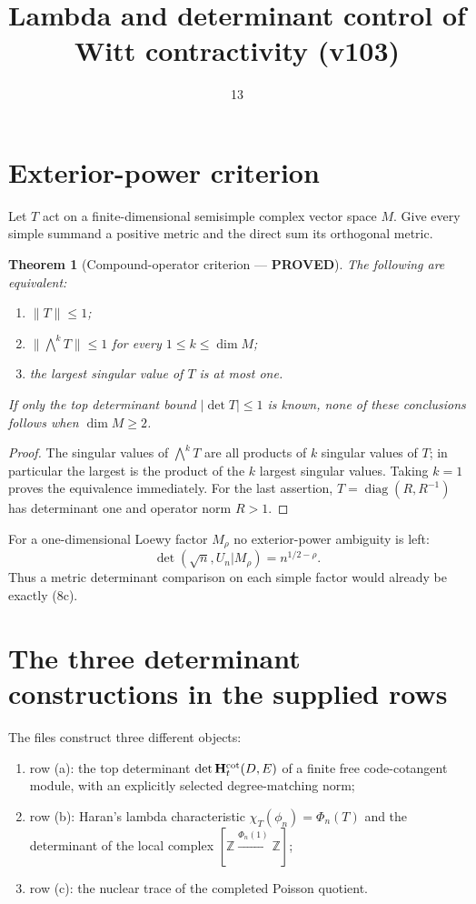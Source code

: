 \documentclass[11pt]{article}
\title{Lambda and determinant control of Witt contractivity (v103)}
\date{13}
\newcommand{\PROVED}{\textcolor{green!40!black}{\textbf{PROVED}}}
\newtheorem{theorem}{Theorem}
\begin{document}
\maketitle

\section{Exterior-power criterion}

Let $T$ act on a finite-dimensional semisimple complex vector space $M$.
Give every simple summand a positive metric and the direct sum its
orthogonal metric.

\begin{theorem}[Compound-operator criterion --- \PROVED]
The following are equivalent:
\begin{enumerate}
\item $\|T\|\le1$;
\item $\|\bigwedge^kT\|\le1$ for every $1\le k\le\dim M$;
\item the largest singular value of $T$ is at most one.
\end{enumerate}
If only the top determinant bound
$|\det T|\le1$ is known, none of these conclusions follows when
$\dim M\ge2$.
\end{theorem}

\begin{proof}
The singular values of $\bigwedge^kT$ are all products of $k$ singular
values of $T$; in particular the largest is the product of the $k$ largest
singular values.  Taking $k=1$ proves the equivalence immediately.  For the
last assertion, $T=\operatorname{diag}(R,R^{-1})$ has determinant one and
operator norm $R>1$.
\end{proof}

For a one-dimensional Loewy factor $M_\rho$ no exterior-power ambiguity is
left:
\begin{equation}
 \det(\sqrt n,U_n|M_\rho)=n^{1/2-\rho}.             \tag{1}
\end{equation}
Thus a metric determinant comparison on each simple factor would already
be exactly (8c).

\section{The three determinant constructions in the supplied rows}

The files construct three different objects:
\begin{enumerate}
\item row (a): the top determinant
$\det\mathbf H_t^{\rm cot}(D,E)$ of a finite free code-cotangent module,
with an explicitly selected degree-matching norm;
\item row (b): Haran's lambda characteristic
$\chi_T(\phi_n)=\Phi_n(T)$ and the determinant of the local complex
$[\mathbb Z\xrightarrow{\Phi_n(1)}\mathbb Z]$;
\item row (c): the nuclear trace of the completed Poisson quotient.
\end{enumerate}
\end{document}
